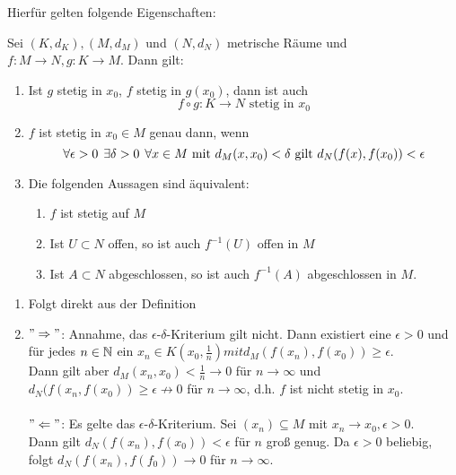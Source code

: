 Hierfür gelten folgende Eigenschaften:

\begin{prop} \label{prop:1-4.13}
	Sei $(K,d_{K}), (M, d_{M})$ und $(N, d_{N})$ metrische Räume und $f: M \rightarrow N, g: K \rightarrow M$. Dann gilt:
	\begin{enumerate}[label=\alph*\upshape)]
		\item Ist $g$ stetig in $x_{0}$, $f$ stetig in $g(x_{0})$, dann ist auch 
			\[ f \circ g: K \rightarrow N \text{ stetig in } x_{0} \]
		\item \label{prop:1-4.13.b} $f$ ist stetig in $x_{0} \in M$ genau dann, wenn 
			\[ \forall \epsilon > 0 \hspace{0.15cm} \exists \delta > 0 \hspace{0.15cm} \forall x \in M \text{ mit } d_{M}(x, x_{0}) < \delta \text{ gilt } d_{N}(f(x), f(x_{0})) < \epsilon \]
		\item Die folgenden Aussagen sind äquivalent:
			\begin{enumerate}
				\item $f$ ist stetig auf $M$
				\item Ist $U \subset N$ offen, so ist auch $f^{-1}(U)$ offen in $M$
				\item Ist $A \subset N$ abgeschlossen, so ist auch $f^{-1}(A)$ abgeschlossen in $M$.
			\end{enumerate}
	\end{enumerate}	
	\begin{beweis}		
		\begin{enumerate}[label=\alph*\upshape)]	
			\item Folgt direkt aus der Definition
			\item $" \Rightarrow "$: Annahme, das $\epsilon$-$\delta$-Kriterium gilt nicht. Dann existiert eine $\epsilon > 0$ und für jedes $n \in \mathbb{N}$ ein $x_{n} \in K(x_{0}, \frac{1}{n}) mit d_{M}(f(x_{n}), f(x_{0})) \geq \epsilon$. \\
				Dann gilt aber $d_{M}(x_{n}, x_{0}) < \frac{1}{n} \rightarrow 0$ für $n \rightarrow \infty$ und $d_{N}(f(x_{n}, f(x_{0})) \geq \epsilon \not\rightarrow 0$ für $n \rightarrow \infty$, d.h. $f$ ist nicht stetig in $x_{0}$. \\ \\
				$" \Leftarrow "$: Es gelte das $\epsilon$-$\delta$-Kriterium. Sei $(x_{n}) \subseteq M$ mit $x_{n} \rightarrow x_{0}, \epsilon > 0$. \\
				Dann gilt $d_{N}(f(x_{n}), f(x_{0})) < \epsilon$ für $n$ gro{\ss} genug. Da $\epsilon > 0$ beliebig, folgt $d_{N}(f(x_{n}), f(f_{0})) \rightarrow 0$ für $n \rightarrow \infty$.

\end{enumerate}
\end{beweis}
\end{prop}
